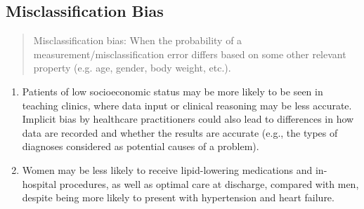


\subsection{Misclassification Bias}

\begin{quote}
Misclassification bias: When the probability of a measurement/misclassification error differs based on some other relevant property (e.g. age, gender, body weight, etc.). 
\end{quote}

\begin{enumerate}
\item Patients of low socioeconomic status may be more likely to be seen in teaching clinics, where data input or clinical reasoning may be less accurate. Implicit bias by healthcare practitioners could also lead to differences in how data are recorded and whether the results are accurate (e.g., the types of diagnoses considered as potential causes of a problem). 
\item Women may be less likely to receive lipid-lowering medications and in-hospital procedures, as well as optimal care at discharge, compared with men, despite being more likely to present with hypertension and heart failure. 
\end{enumerate}

